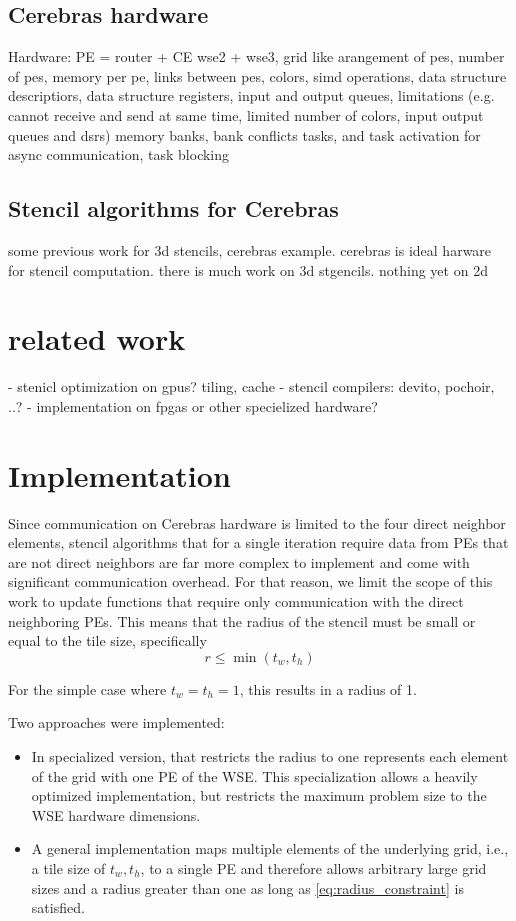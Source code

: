 \documentclass{article}
\begin{document}
\subsection{Cerebras hardware}
Hardware: PE = router + CE
wse2 + wse3, grid like arangement of pes, number of pes, memory per pe, links between pes, colors, simd operations, data structure descriptiors, data structure registers, input and output queues, limitations (e.g. cannot receive and send at same time, limited number of colors, input output queues and dsrs)
memory banks, bank conflicts
tasks, and task activation for async communication, task blocking
\subsection{Stencil algorithms for Cerebras}
some previous work for 3d stencils, cerebras example.
cerebras is ideal harware for stencil computation. 
there is much work on 3d stgencils. nothing yet on 2d
\section{related work}
- stenicl optimization on gpus? tiling, cache
- stencil compilers: devito, pochoir, ..?
- implementation on fpgas or other specielized hardware?



\section{Implementation}
Since communication on Cerebras hardware is limited to the four direct neighbor elements, stencil algorithms that for a single iteration require data from PEs that are not direct neighbors are far more complex to implement and come with significant communication overhead. For that reason, we limit the scope of this work to update functions that require only communication with the direct neighboring PEs. This means that the radius of the stencil must be small or equal to the tile size, specifically
\begin{equation}    
\label{eq:radius_constraint}
r \leq \min(t_w, t_h)
\end{equation}

For the simple case where $t_w=t_h=1$, this results in a radius of 1.

Two approaches were implemented:
\begin{itemize}
    \item In specialized version, that restricts the radius to one represents each element of the grid with one PE of the WSE. This specialization allows a heavily optimized implementation, but restricts the maximum problem size to the WSE hardware dimensions.
    \item A general implementation maps multiple elements of the underlying grid, i.e., a tile size of $t_w, t_h$, to a single PE and therefore allows arbitrary large grid sizes and a radius greater than one as long as \ref{eq:radius_constraint} is satisfied. 
\end{itemize}
\end{document}
